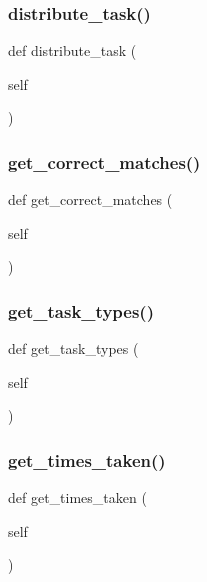 \subsubsection{\texorpdfstring{distribute\_task()}{distribute\_task()}}
{\footnotesize\ttfamily def distribute\+\_\+task (\begin{DoxyParamCaption}\item[{}]{self }\end{DoxyParamCaption})}

\mbox{\label{classdynamicfilterapp_1_1models_1_1_predicate_ac0edbf94b370ed541539c84ecfede353}} 
\subsubsection{\texorpdfstring{get\_correct\_matches()}{get\_correct\_matches()}}
{\footnotesize\ttfamily def get\+\_\+correct\+\_\+matches (\begin{DoxyParamCaption}\item[{}]{self }\end{DoxyParamCaption})}

\mbox{\label{classdynamicfilterapp_1_1models_1_1_predicate_ab5ba298be003142db12f57fa67c40a66}} 
\subsubsection{\texorpdfstring{get\_task\_types()}{get\_task\_types()}}
{\footnotesize\ttfamily def get\+\_\+task\+\_\+types (\begin{DoxyParamCaption}\item[{}]{self }\end{DoxyParamCaption})}

\mbox{\label{classdynamicfilterapp_1_1models_1_1_predicate_aeb336756b1c72d57020a7b9f968b763e}} 
\subsubsection{\texorpdfstring{get\_times\_taken()}{get\_times\_taken()}}
{\footnotesize\ttfamily def get\+\_\+times\+\_\+taken (\begin{DoxyParamCaption}\item[{}]{self }\end{DoxyParamCaption})}

